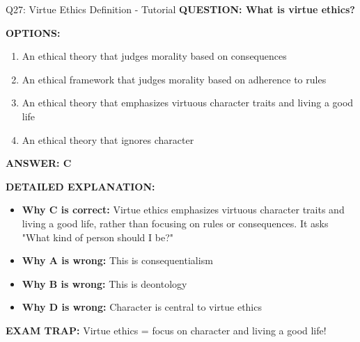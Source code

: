 \documentclass[8pt]{beamer}
\begin{document}
	\begin{frame}{Q27: Virtue Ethics Definition - Tutorial}
		\fontsize{6.5}{7.5}\selectfont
		\textbf{QUESTION: What is virtue ethics?}
		
		\vspace{0.1cm}
		\textbf{OPTIONS:}
		\begin{enumerate}
			\item An ethical theory that judges morality based on consequences
			\item An ethical framework that judges morality based on adherence to rules
			\item An ethical theory that emphasizes virtuous character traits and living a good life
			\item An ethical theory that ignores character
		\end{enumerate}
		
		\vspace{0.1cm}
		\textcolor{myblue}{\textbf{ANSWER: C}}
		
		\vspace{0.1cm}
		\textbf{DETAILED EXPLANATION:}
		\begin{itemize}
			\item \textbf{Why C is correct:} Virtue ethics emphasizes virtuous character traits and living a good life, rather than focusing on rules or consequences. It asks "What kind of person should I be?"
			\item \textbf{Why A is wrong:} This is consequentialism
			\item \textbf{Why B is wrong:} This is deontology
			\item \textbf{Why D is wrong:} Character is central to virtue ethics
		\end{itemize}
		
		\textcolor{myred}{\textbf{EXAM TRAP:}} Virtue ethics = \textcolor{myblue}{focus on character and living a good life}!
	\end{frame}
	
\end{document}
